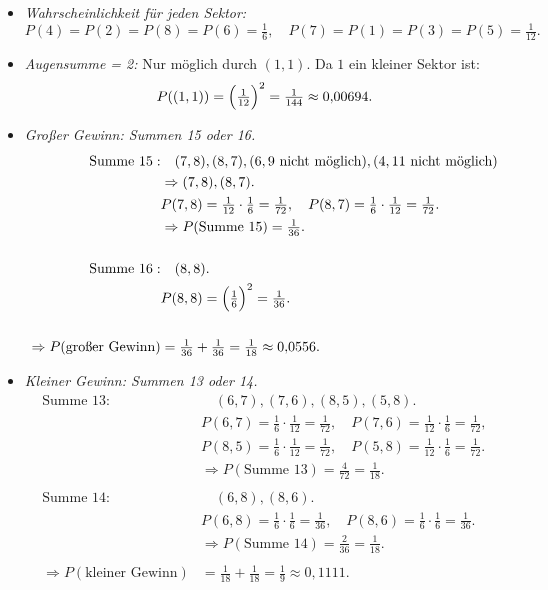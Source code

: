 \documentclass[11pt,a4paper,oneside]{article}
\begin{document}
\begin{loesung}
\begin{enumerate}
			\begin{itemize}
				\item \emph{Wahrscheinlichkeit für jeden Sektor:}  
				\[
				P(4)=P(2)=P(8)=P(6)=\tfrac{1}{6}, \quad
				P(7)=P(1)=P(3)=P(5)=\tfrac{1}{12}.
				\]
				
				\item \emph{Augensumme = 2:}  
				Nur möglich durch $(1,1)$. Da $1$ ein kleiner Sektor ist:  
				\[
				P((1,1)) = \Bigl(\tfrac{1}{12}\Bigr)^2 = \tfrac{1}{144} \approx 0{,}00694.
				\]
				
				\item \emph{Großer Gewinn: Summen 15 oder 16.}  
				\begin{align*}
					\text{Summe } 15: &\quad (7,8),(8,7),(6,9\ \text{nicht möglich}), (4,11\ \text{nicht möglich}) \\
					&\Rightarrow (7,8),(8,7). \\
					&P(7,8) = \tfrac{1}{12}\cdot\tfrac{1}{6}=\tfrac{1}{72}, \quad P(8,7)=\tfrac{1}{6}\cdot\tfrac{1}{12}=\tfrac{1}{72}. \\
					&\Rightarrow P(\text{Summe }15)=\tfrac{1}{36}. \\
					\\
					\text{Summe } 16: &\quad (8,8). \\
					&P(8,8)=\Bigl(\tfrac{1}{6}\Bigr)^2=\tfrac{1}{36}. \\
					\\
					\Rightarrow P(\text{großer Gewinn}) &= \tfrac{1}{36}+\tfrac{1}{36}=\tfrac{1}{18}\approx 0{,}0556.
				\end{align*}
				
				\item \emph{Kleiner Gewinn: Summen 13 oder 14.}  
				\begin{align*}
					\text{Summe } 13: &\quad (6,7),(7,6),(8,5),(5,8). \\
					&P(6,7)=\tfrac{1}{6}\cdot\tfrac{1}{12}=\tfrac{1}{72}, \quad P(7,6)=\tfrac{1}{12}\cdot\tfrac{1}{6}=\tfrac{1}{72}, \\
					&P(8,5)=\tfrac{1}{6}\cdot\tfrac{1}{12}=\tfrac{1}{72}, \quad P(5,8)=\tfrac{1}{12}\cdot\tfrac{1}{6}=\tfrac{1}{72}. \\
					&\Rightarrow P(\text{Summe }13)=\tfrac{4}{72}=\tfrac{1}{18}. \\
					\\
					\text{Summe } 14: &\quad (6,8),(8,6). \\
					&P(6,8)=\tfrac{1}{6}\cdot\tfrac{1}{6}=\tfrac{1}{36}, \quad P(8,6)=\tfrac{1}{6}\cdot\tfrac{1}{6}=\tfrac{1}{36}. \\
					&\Rightarrow P(\text{Summe }14)=\tfrac{2}{36}=\tfrac{1}{18}. \\
					\\
					\Rightarrow P(\text{kleiner Gewinn}) &= \tfrac{1}{18}+\tfrac{1}{18}=\tfrac{1}{9}\approx 0{,}1111.
				\end{align*}
				

\end{itemize}
\end{enumerate}
\end{loesung}
\end{document}
